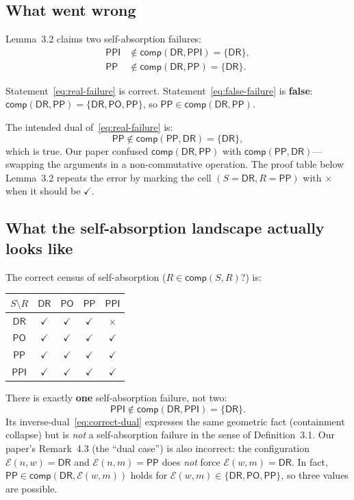 \documentclass[a4paper,11pt]{article}
\theoremstyle{definition}
\newcommand{\DR}{\ensuremath{\mathsf{DR}}}
\newcommand{\PO}{\ensuremath{\mathsf{PO}}}
\newcommand{\PP}{\ensuremath{\mathsf{PP}}}
\newcommand{\PPI}{\ensuremath{\mathsf{PPI}}}
\newcommand{\comp}{\ensuremath{\mathsf{comp}}}
\begin{document}
\subsection{What went wrong}

Lemma~3.2 claims two self-absorption failures:
\begin{align}
  \PPI &\notin \comp(\DR, \PPI) = \{\DR\},
    \label{eq:real-failure} \\
  \PP &\notin \comp(\DR, \PP) = \{\DR\}.
    \label{eq:false-failure}
\end{align}

Statement~\eqref{eq:real-failure} is correct.
Statement~\eqref{eq:false-failure} is \textbf{false}: $\comp(\DR,
\PP) = \{\DR, \PO, \PP\}$, so $\PP \in \comp(\DR, \PP)$.

The intended dual of~\eqref{eq:real-failure} is:
\begin{equation}
  \label{eq:correct-dual}
  \PP \notin \comp(\PP, \DR) = \{\DR\},
\end{equation}
which is true.  Our paper confused $\comp(\DR, \PP)$ with
$\comp(\PP, \DR)$---swapping the arguments in a non-commutative
operation.  The proof table below Lemma~3.2 repeats the error by
marking the cell $(S{=}\DR, R{=}\PP)$ with $\times$ when it should be
$\checkmark$.

\subsection{What the self-absorption landscape actually looks like}

The correct census of self-absorption ($R \in \comp(S, R)$?) is:
\begin{center}
\renewcommand{\arraystretch}{1.1}
\begin{tabular}{c|cccc}
\toprule
$S \setminus R$ & $\DR$ & $\PO$ & $\PP$ & $\PPI$ \\
\midrule
$\DR$  & $\checkmark$ & $\checkmark$ & $\checkmark$ & $\times$ \\
$\PO$  & $\checkmark$ & $\checkmark$ & $\checkmark$ & $\checkmark$ \\
$\PP$  & $\checkmark$ & $\checkmark$ & $\checkmark$ & $\checkmark$ \\
$\PPI$ & $\checkmark$ & $\checkmark$ & $\checkmark$ & $\checkmark$ \\
\bottomrule
\end{tabular}
\end{center}

There is exactly \textbf{one} self-absorption failure, not two:
\[
  \PPI \notin \comp(\DR, \PPI) = \{\DR\}.
\]
Its inverse-dual~\eqref{eq:correct-dual} expresses the same geometric
fact (containment collapse) but is \emph{not} a self-absorption
failure in the sense of Definition~3.1.  Our paper's Remark~4.3 (the
``dual case'') is also incorrect: the configuration $\mathcal{E}(n,w)
= \DR$ and $\mathcal{E}(n,m) = \PP$ does \emph{not} force
$\mathcal{E}(w,m) = \DR$.  In fact, $\PP \in \comp(\DR,
\mathcal{E}(w,m))$ holds for $\mathcal{E}(w,m) \in \{\DR, \PO,
\PP\}$, so three values are possible.
\end{document}
